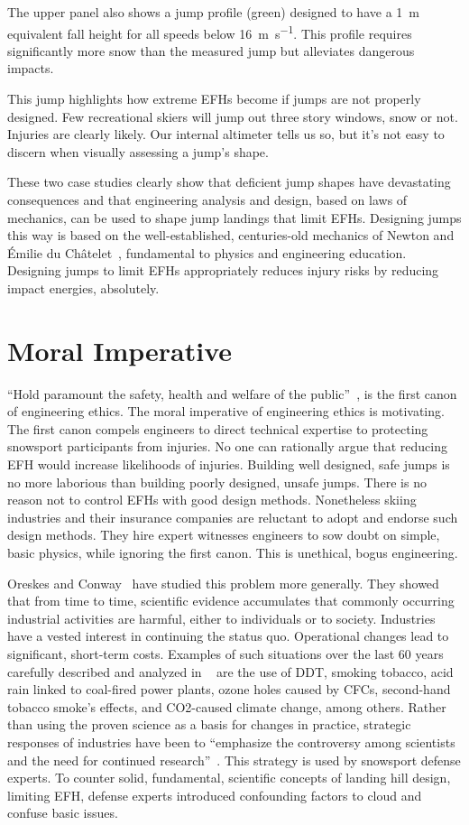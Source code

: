 \documentclass[smallextended]{svjour3}       %
\begin{document}
The upper panel also shows a jump profile (green) designed to have a
1~\si{\meter} equivalent fall height for all speeds below
16~\si{\meter\per\second}. This profile requires significantly more snow than
the measured jump but alleviates dangerous impacts.

This jump highlights how extreme EFHs become if jumps
are not properly designed. Few recreational skiers will jump out three
story windows, snow or not. Injuries are clearly likely.
Our internal altimeter tells us so, but it's not easy to discern when visually assessing a jump's shape.

These two case studies clearly show that deficient jump shapes have
devastating consequences and that engineering analysis and design, based on 
laws of mechanics, can be used to shape jump landings that limit EFHs. Designing jumps this way is based on the well-established,
centuries-old mechanics of Newton and Émilie du Châtelet~\cite{Zinsser2007}, fundamental to physics and engineering education. Designing jumps to limit EFHs appropriately reduces injury risks by reducing impact energies, absolutely.

\section{Moral Imperative}
\label{sec:moral}
%
``Hold paramount the safety, health and welfare of the
public''~\cite{NSPE2019}, is the first canon of engineering ethics. The moral imperative of engineering ethics is motivating. The first canon
compels engineers to direct technical expertise to protecting snowsport
participants from injuries. No one can rationally argue that reducing
EFH would increase likelihoods of injuries. Building well designed, safe jumps is no more laborious than building poorly designed, unsafe jumps. There is no reason not to control
EFHs with good design methods. Nonetheless skiing
industries and their insurance companies are reluctant to adopt and endorse such design methods. They hire expert witnesses engineers to sow doubt on simple, basic physics, while ignoring the first canon. This is unethical, bogus engineering. 

Oreskes and Conway~\cite{Oreskes2010} have studied this problem more generally.
They showed that from time to time, scientific evidence accumulates that
commonly occurring industrial activities are harmful, either to
individuals or to society. Industries have a
vested interest in continuing the status quo. Operational changes  lead to significant, short-term costs. Examples of such situations
over the last 60 years carefully described and analyzed in
~\cite{Oreskes2010} are the use of DDT, smoking tobacco, acid rain linked to
coal-fired power plants, ozone holes caused by CFCs, second-hand tobacco
smoke’s effects, and CO2-caused climate change, among others. Rather than using
the proven science as a basis for changes in practice, strategic
responses of industries have been to “emphasize the controversy
among scientists and the need for continued research”~\cite{Oreskes2010}. This strategy is used by snowsport defense experts. To counter solid,
fundamental, scientific concepts of landing hill design, limiting EFH, defense experts introduced confounding factors to
cloud and confuse basic issues. 
\end{document}

